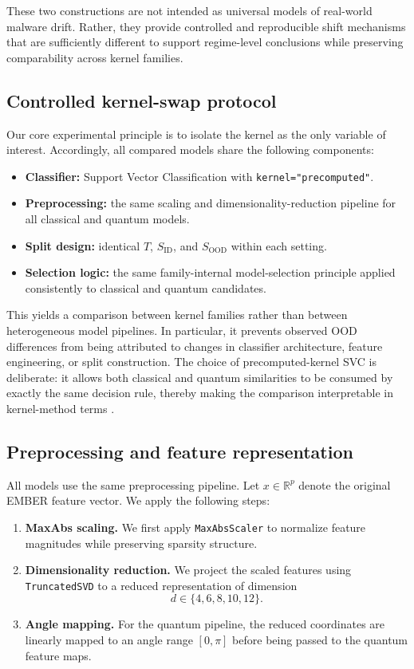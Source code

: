 \documentclass[pdflatex,sn-mathphys-num]{sn-jnl}%
\theoremstyle{thmstyleone}%
\theoremstyle{thmstyletwo}%
\theoremstyle{thmstylethree}%
\begin{document}
These two constructions are not intended as universal models of real-world malware drift. Rather, they provide controlled and reproducible shift mechanisms that are sufficiently different to support regime-level conclusions while preserving comparability across kernel families.

\subsection{Controlled kernel-swap protocol}

Our core experimental principle is to isolate the kernel as the only variable of interest. Accordingly, all compared models share the following components:

\begin{itemize}
    \item \textbf{Classifier:} Support Vector Classification with \texttt{kernel="precomputed"}.
    \item \textbf{Preprocessing:} the same scaling and dimensionality-reduction pipeline for all classical and quantum models.
    \item \textbf{Split design:} identical $T$, $S_{\mathrm{ID}}$, and $S_{\mathrm{OOD}}$ within each setting.
    \item \textbf{Selection logic:} the same family-internal model-selection principle applied consistently to classical and quantum candidates.
\end{itemize}

This yields a comparison between kernel families rather than between heterogeneous model pipelines. In particular, it prevents observed OOD differences from being attributed to changes in classifier architecture, feature engineering, or split construction. The choice of precomputed-kernel SVC is deliberate: it allows both classical and quantum similarities to be consumed by exactly the same decision rule, thereby making the comparison interpretable in kernel-method terms \cite{cortes1995svm,scholkopf2002learningwithkernels}.

\subsection{Preprocessing and feature representation}

All models use the same preprocessing pipeline. Let $x \in \mathbb{R}^p$ denote the original EMBER feature vector. We apply the following steps:

\begin{enumerate}
    \item \textbf{MaxAbs scaling.} We first apply \texttt{MaxAbsScaler} to normalize feature magnitudes while preserving sparsity structure.
    \item \textbf{Dimensionality reduction.} We project the scaled features using \texttt{TruncatedSVD} to a reduced representation of dimension
    \[
    d \in \{4,6,8,10,12\}.
    \]
    \item \textbf{Angle mapping.} For the quantum pipeline, the reduced coordinates are linearly mapped to an angle range $[0,\pi]$ before being passed to the quantum feature maps.
\end{enumerate}
\end{document}
